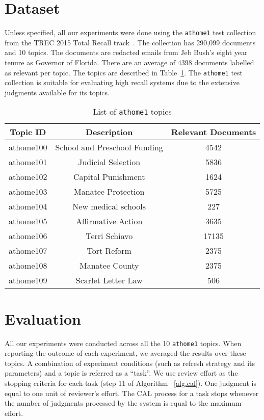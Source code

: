 \label{chap:dataset}

\section{Dataset}
Unless specified, all our experiments were done using the \texttt{athome1} test
collection from the TREC 2015 Total Recall track~\cite{roegiest2015trec}. The
collection has 290,099 documents and 10 topics. The documents are redacted
emails from Jeb Bush's eight year tenure as Governor of Florida. There are
an average of 4398 documents labelled as relevant per topic. The topics are described in
Table~\ref{tab:topics}. The \texttt{athome1} test collection is suitable for
evaluating high recall systems due to the extensive judgments available for its
topics.

\begin{table}[h]
\centering
\caption{List of \texttt{athome1} topics}
\label{tab:topics}
\begin{tabular}{|c|c|c|}
\hline
\textbf{Topic ID} & \textbf{Description} & \textbf{Relevant Documents} \\ \hline \hline
athome100 & School and Preschool Funding & 4542 \\ \hline
athome101 & Judicial Selection & 5836 \\ \hline
athome102 & Capital Punishment & 1624 \\ \hline
athome103 & Manatee Protection & 5725 \\ \hline
athome104 & New medical schools & 227 \\ \hline
athome105 & Affirmative Action & 3635 \\ \hline
athome106 & Terri Schiavo & 17135 \\ \hline
athome107 & Tort Reform & 2375 \\ \hline
athome108 & Manatee County & 2375 \\ \hline
athome109 & Scarlet Letter Law & 506 \\ \hline
\end{tabular}
\end{table}


\section{Evaluation}
\label{sec:eval}

All our experiments were conducted across all the 10 \texttt{athome1} topics.
When reporting the outcome of each experiment, we averaged the results over
these topics. A combination of experiment conditions (such as refresh strategy
and its parameters) and a topic is referred as
a ``task''. We use review effort as the stopping criteria for each task (step 11
of Algorithm ~\ref{alg.cal}). One judgment is equal to one unit of reviewer's
effort. The CAL process for a task stops whenever the number of judgments
processed by the system is equal to the maximum effort.

